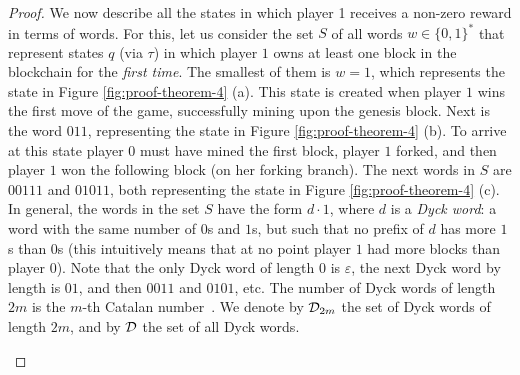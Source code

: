 \begin{proof}
We now describe all the states in which player 1 receives a non-zero reward in terms of words. For this, let us consider the set $S$ of all words $w \in \{0,1\}^*$ that represent states $q$ (via $\tau$) in which player $1$ owns at least one block in the blockchain for the {\em first time}. 
The smallest of them is $w = 1$, which represents the state in Figure \ref{fig:proof-theorem-4} (a). This state is created when player $1$ wins the first move of the game, successfully mining upon the genesis block. Next is the word $011$, representing the state in Figure \ref{fig:proof-theorem-4} (b). To arrive at this state player $0$ must have mined the first block, player $1$ forked, and then player $1$ 
won the following block (on her forking branch). The next words in $S$ are $00111$ and $01011$, both representing the state in Figure \ref{fig:proof-theorem-4} (c). 
In general, the words in the set $S$ have the form $d\cdot 1$, where $d$ is a \emph{Dyck word}: a word with the same number of $0$s and $1$s, but such that 
no prefix of $d$ has more $1$s than $0$s (this intuitively means that at no point player $1$ had more blocks than player $0$). Note that the only Dyck word of length $0$ is $\varepsilon$, the next Dyck word by length is $01$, and then $0011$ and $0101$, etc. The number of Dyck words of length $2m$ is the $m$-th Catalan number~\cite{stanley2015catalan}. We denote by $\Dyck_{2m}$ the set of Dyck words of length $2m$, and by $\Dyck$ the set of all Dyck words.

\begin{figure}
%
%
%
%
%	
%
%
%	
%	
%
\centering
\begin{tikzpicture}[->,>=stealth',auto,thick, scale = 0.61,state/.style={circle,inner sep=2pt}]


\end{tikzpicture}
\end{figure}
\end{proof}
